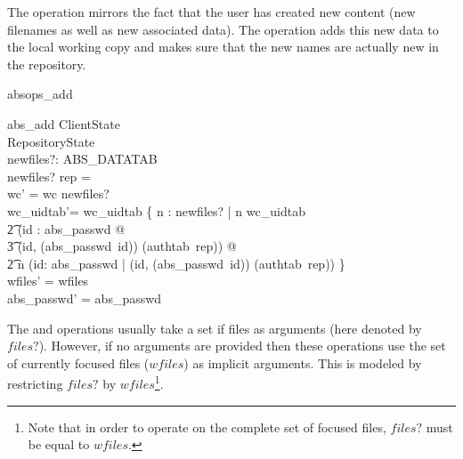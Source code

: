 The  operation mirrors the fact that the user has created new
content (new filenames as well as new associated data). The operation adds this
new data to the local working copy and makes sure that the new names are
actually new in the repository.
\begin{doc}{absops_add}
  \begin{schema}{abs\_add}
    \Delta ClientState \\
    \Xi RepositoryState \\
    newfiles?: ABS\_DATATAB \\
    \where
    \dom newfiles? \cap \dom rep = \emptyset \\
    wc' = wc \oplus newfiles?  \\
    wc\_uidtab'= wc\_uidtab \oplus \{ n : \dom newfiles? | n \notin \dom wc\_uidtab \\
    \t2  \land (\exists id : \dom abs\_passwd @ \\
    \t3 (id, (abs\_passwd~id)) \in \dom (authtab~rep)) @\\
    \t2 n \mapsto (\mu id:
    \dom abs\_passwd | (id, (abs\_passwd~id)) \in \dom (authtab~rep)) \} \\
    wfiles' = wfiles \\
    abs\_passwd' = abs\_passwd \\
  \end{schema}
\end{doc} 
The  and  operations usually take a set if files
as arguments (here denoted by $files?$).  However, if no arguments are provided
then these operations use the set of currently focused files ($wfiles$) as
implicit arguments.  This is modeled by restricting $files?$ by 
$wfiles$\footnote{Note that in order to operate on the
complete set of focused files, $files?$ must be equal to $wfiles$.}.


